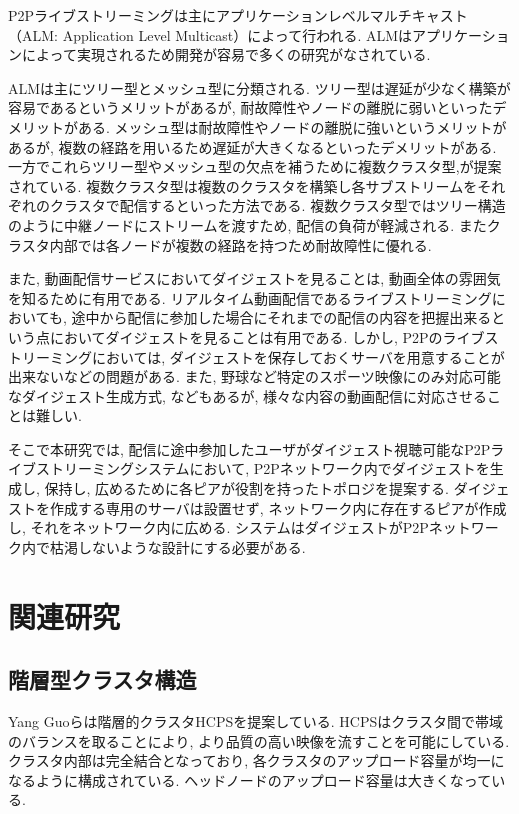 \documentclass[letter]{ieicej}
\begin{document}
P2Pライブストリーミングは主にアプリケーションレベルマルチキャスト（ALM: Application Level Multicast）によって行われる. ALMはアプリケーションによって実現されるため開発が容易で多くの研究がなされている.

ALMは主にツリー型とメッシュ型に分類される. ツリー型は遅延が少なく構築が容易であるというメリットがあるが, 耐故障性やノードの離脱に弱いといったデメリットがある. メッシュ型は耐故障性やノードの離脱に強いというメリットがあるが, 複数の経路を用いるため遅延が大きくなるといったデメリットがある. 一方でこれらツリー型やメッシュ型の欠点を補うために複数クラスタ型\cite{dis},\cite{streamline}が提案されている. 複数クラスタ型は複数のクラスタを構築し各サブストリームをそれぞれのクラスタで配信するといった方法である. 複数クラスタ型ではツリー構造のように中継ノードにストリームを渡すため, 配信の負荷が軽減される. またクラスタ内部では各ノードが複数の経路を持つため耐故障性に優れる.

また, 動画配信サービスにおいてダイジェストを見ることは, 動画全体の雰囲気を知るために有用である. リアルタイム動画配信であるライブストリーミングにおいても, 途中から配信に参加した場合にそれまでの配信の内容を把握出来るという点においてダイジェストを見ることは有用である. しかし, P2Pのライブストリーミングにおいては, ダイジェストを保存しておくサーバを用意することが出来ないなどの問題がある. また, 野球など特定のスポーツ映像にのみ対応可能なダイジェスト生成方式\cite{bb}, \cite{sport}などもあるが, 様々な内容の動画配信に対応させることは難しい.

そこで本研究では, 配信に途中参加したユーザがダイジェスト視聴可能なP2Pライブストリーミングシステムにおいて, P2Pネットワーク内でダイジェストを生成し, 保持し, 広めるために各ピアが役割を持ったトポロジを提案する. ダイジェストを作成する専用のサーバは設置せず, ネットワーク内に存在するピアが作成し, それをネットワーク内に広める. システムはダイジェストがP2Pネットワーク内で枯渇しないような設計にする必要がある.

\section{関連研究}
\subsection{階層型クラスタ構造}
Yang Guoらは階層的クラスタHCPS\cite{hcps}を提案している. HCPSはクラスタ間で帯域のバランスを取ることにより, より品質の高い映像を流すことを可能にしている. クラスタ内部は完全結合となっており, 各クラスタのアップロード容量が均一になるように構成されている. ヘッドノードのアップロード容量は大きくなっている.
\end{document}

